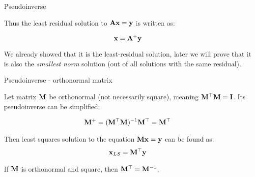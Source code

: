 \documentclass{beamer}
\begin{document}
\begin{frame}{Pseudoinverse}
	\begin{flushleft}
		
		Thus the least residual solution to $\mathbf{A}\mathbf{x} = \mathbf{y}$ is written as:
		
		\begin{equation}
			\mathbf{x} = \mathbf{A}^+\mathbf{y}
		\end{equation}
		
		We already showed that it is the least-residual solution, later we will prove that it is also the \emph{smallest norm} solution (out of all solutions with the same residual).
		
	\end{flushleft}
\end{frame}




\begin{frame}{Pseudoinverse - orthonormal matrix}
	\begin{flushleft}
		
		Let matrix $\mathbf{M}$ be orthonormal (not necessarily square), meaning $\mathbf{M}^\top \mathbf{M} = \mathbf{I}$. Its  pseudoinverse can be simplified:
		
		\begin{align}
			\mathbf{M}^+ = (\mathbf{M}^\top\mathbf{M})^{-1} \mathbf{M}^\top = \mathbf{M}^\top
		\end{align}
	
		\bigskip
	
		Then least squares solution to the equation $\mathbf{M} \mathbf{x} = \mathbf{y}$ can be found as:
		\begin{align}
			\mathbf{x}_{LS} = \mathbf{M}^\top \mathbf{y}
		\end{align}
	
		If $\mathbf{M}$ is orthonormal and square, then $\mathbf{M}^\top = \mathbf{M}^{-1}$.
	
	
	\end{flushleft}
\end{frame}
\end{document}
